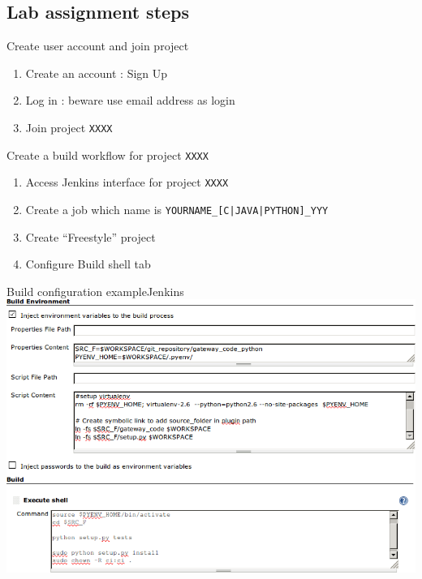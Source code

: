 \documentclass[9pt]{beamer}
\begin{document}
\subsection{Lab assignment steps}
\begin{frame}{\subsecname} %

\begin{block}{Create user account and join project}
\begin{enumerate}
\item Create an account : Sign Up
\item Log in : beware use email address as login
\item Join project \texttt{XXXX}
\end{enumerate}
\end{block}

\begin{block}{Create a build workflow for project \texttt{XXXX}}
\begin{enumerate}
\item Access Jenkins interface for project \texttt{XXXX}
\item Create a job which name is \texttt{YOURNAME\_[C|JAVA|PYTHON]\_YYY}
\item Create ``Freestyle'' project
\item Configure Build shell tab
\end{enumerate}
\end{block}
\end{frame}

\begin{frame}{Build configuration example}{Jenkins}
  \includegraphics[width=\linewidth]{images/build_configuration}
\end{frame}
\end{document}
